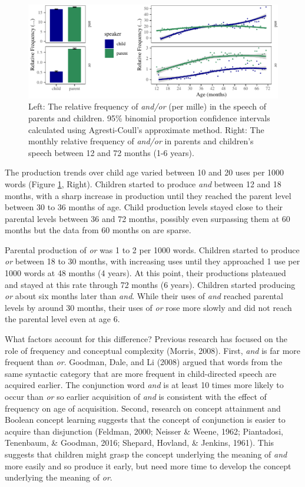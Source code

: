 \documentclass[
  english,
  ,man,floatsintext]{apa6}
\begin{document}
\begin{figure}[H]

{\centering \includegraphics{figs/freqPlots-1} 

}

\caption{Left: The relative frequency of \textit{and/or} (per mille) in the speech of parents and children. 95\% binomial proportion confidence intervals calculated using Agresti-Coull's approximate method. Right: The monthly relative frequency of \textit{and/or} in parents and children's speech between 12 and 72 months (1-6 years).}\label{fig:freqPlots}
\end{figure}

The production trends over child age varied between 10 and 20 uses per 1000 words (Figure \ref{fig:freqPlots}, Right). Children started to produce \emph{and} between 12 and 18 months, with a sharp increase in production until they reached the parent level between 30 to 36 months of age. Child production levels stayed close to their parental levels between 36 and 72 months, possibly even surpassing them at 60 months but the data from 60 months on are sparse.

Parental production of \emph{or} was 1 to 2 per 1000 words. Children started to produce \emph{or} between 18 to 30 months, with increasing uses until they approached 1 use per 1000 words at 48 months (4 years). At this point, their productions plateaued and stayed at this rate through 72 months (6 years). Children started producing \emph{or} about six months later than \emph{and}. While their uses of \emph{and} reached parental levels by around 30 months, their uses of \emph{or} rose more slowly and did not reach the parental level even at age 6.

What factors account for this difference? Previous research has focused on the role of frequency and conceptual complexity (Morris, 2008). First, \emph{and} is far more frequent than \emph{or}. Goodman, Dale, and Li (2008) argued that words from the same syntactic category that are more frequent in child-directed speech are acquired earlier. The conjunction word \emph{and} is at least 10 times more likely to occur than \emph{or} so earlier acquisition of \emph{and} is consistent with the effect of frequency on age of acquisition. Second, research on concept attainment and Boolean concept learning suggests that the concept of conjunction is easier to acquire than disjunction (Feldman, 2000; Neisser \& Weene, 1962; Piantadosi, Tenenbaum, \& Goodman, 2016; Shepard, Hovland, \& Jenkins, 1961). This suggests that children might grasp the concept underlying the meaning of \emph{and} more easily and so produce it early, but need more time to develop the concept underlying the meaning of \emph{or}.
\end{document}
